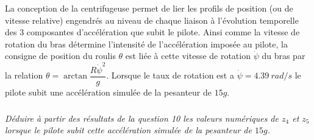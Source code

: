 \documentclass[10pt,fleqn]{article} %
\begin{document}
\begin{multicols}{2}
La conception de la centrifugeuse permet de lier les profils de position (ou de vitesse relative) engendrés au
niveau de chaque liaison à l’évolution temporelle des 3 composantes d’accélération que subit le pilote. Ainsi
comme la vitesse de rotation du bras détermine l’intensité de l’accélération imposée au pilote, la consigne
de position du roulis $\theta$ est liée à cette vitesse de rotation $\dot{\psi}$ du bras par la relation
$ \theta=\arctan\dfrac{R\dot{\psi}^2}{g}$. Lorsque le taux de rotation est a $\dot{\psi}=\SI{4,39}{rad/s}$ le pilote subit une accélération simulée de la pesanteur de $15g$.


\subparagraph{}
\textit{Déduire à partir des résultats de la question 10 les valeurs numériques de $z_4$ et $z_5$ lorsque le pilote
subit cette accélération simulée de la pesanteur de $15 g$.}

\end{multicols}

\newpage

\begin{center}
\end{center}
\begin{center}
\end{center}
\end{document}
